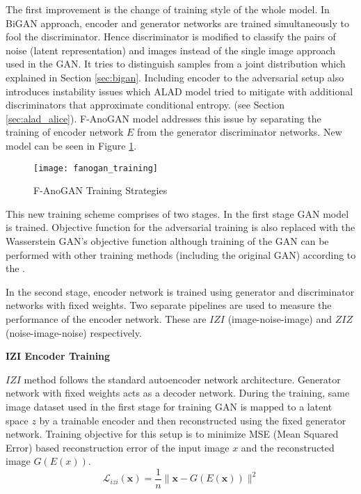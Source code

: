 The first improvement is the change of training style of the whole model. In BiGAN approach,
encoder and generator networks are trained simultaneously to fool the discriminator. Hence discriminator is
modified to classify the pairs of noise (latent representation) and images instead of the single
image approach used in the GAN. It tries to distinguish samples from a joint
distribution which explained in Section \ref{sec:bigan}. Including encoder to the adversarial setup
also introduces instability issues which ALAD model \cite{DBLP:journals/corr/abs-1812-02288}
tried to mitigate with additional discriminators that approximate conditional entropy. (see Section
\ref{sec:alad_alice}). F-AnoGAN model addresses this issue by separating the training of
encoder network $E$ from the generator discriminator networks. New model can be seen in Figure
\ref{fig:fanogan_training}. 
\begin{figure}[h!]
	\centering
	\texttt{[image: fanogan\_training]}
	\caption{F-AnoGAN Training Strategies \cite{pub.1111824956}}
	\label{fig:fanogan_training}
\end{figure}

This new training scheme comprises of two stages. In the first stage GAN model is trained.
Objective function for the adversarial training is also replaced with the Wasserstein GAN's
objective function \cite{Arjovsky2017WassersteinG} 
although training of the GAN can be performed with other training methods (including the
original GAN) according to the \cite{pub.1111824956}.

In the second stage, encoder network is trained using generator and discriminator networks with fixed
weights. Two separate pipelines are used to measure the performance of the encoder network. These are $IZI$
(image-noise-image) and $ZIZ$ (noise-image-noise) respectively. 

\textbf{IZI Encoder Training}

$IZI$ method follows the standard autoencoder network architecture. Generator network with fixed
weights acts as a decoder network. During the training, same image dataset used in the first stage
for training GAN is mapped to a latent space $z$ by a trainable encoder and then reconstructed
using the fixed generator network. Training objective for this setup is to minimize MSE (Mean
Squared Error) based reconstruction error of the input image $x$ and the reconstructed image
$G(E(x))$. 
\begin{equation}
	\mathcal{L}_{i z i}(\mathbf{x})=\frac{1}{n}\|\mathbf{x}-G(E(\mathbf{x}))\|^{2}
\end{equation}

